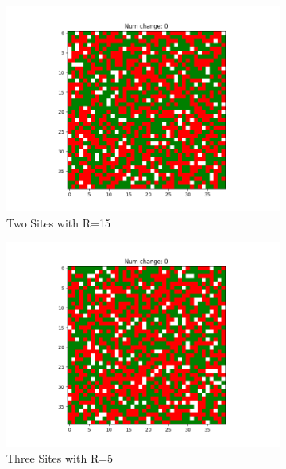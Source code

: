 \documentclass[11pt]{article}
\begin{document}
\begin{figure}[h]
		\begin{subfigure}{0.14\textwidth}
			\includegraphics[width=\linewidth]{policy3_initial_h2r15.png}
			\caption{\centering Two Sites with R=15}
		\end{subfigure}\hfill
		\begin{subfigure}{0.14\textwidth}
			\includegraphics[width=\linewidth]{policy3_initial_h3r5.png}
			\caption{\centering Three Sites with R=5}
		\end{subfigure}\hfill
		\begin{subfigure}{0.14\textwidth}

\end{subfigure}
\end{figure}
\end{document}
